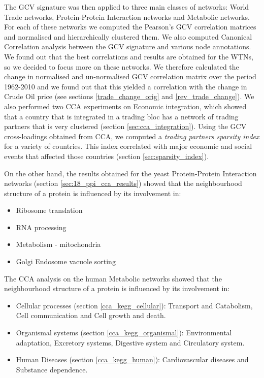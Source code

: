 The GCV signature was then applied to three main classes of networks: World Trade networks, Protein-Protein Interaction networks and Metabolic networks. For each of these networks we computed the Pearson's GCV correlation matrices and normalised and hierarchically clustered them. We also computed Canonical Correlation analysis between the GCV signature and various node annotations. We found out that the best correlations and results are obtained for the WTNs, so we decided to focus more on these networks. We therefore calculated the change in normalised and un-normalised GCV correlation matrix over the period 1962-2010 and we found out that this yielded a correlation with the change in Crude Oil price (see sections \ref{trade_change_orig} and \ref{rev_trade_change}). We also performed two CCA experiments on Economic integration, which showed that a country that is integrated in a trading bloc has a network of trading partners that is very clustered (section \ref{sec:cca_integration}). Using the 
GCV cross-loadings obtained from CCA, we computed a \emph{trading partners sparsity index} for a variety of countries. This index correlated with major economic and social events that affected those countries (section \ref{sec:sparsity_index}).

On the other hand, the results obtained for the yeast Protein-Protein Interaction networks (section \ref{sec:18_ppi_cca_results}) showed that the neighbourhood structure of a protein is influenced by its involvement in:
\begin{itemize}
 \item Ribosome translation
 \item RNA processing
 \item Metabolism - mitochondria
 \item Golgi Endosome vacuole sorting
\end{itemize}
The CCA analysis on the human Metabolic networks showed that the neighbourhood structure of a protein is influenced by its involvement in:
\begin{itemize}
 \item Cellular processes (section \ref{cca_kegg_cellular}): Transport and Catabolism, Cell communication and Cell growth and death.
 \item Organismal systems (section \ref{cca_kegg_organismal}): Environmental adaptation, Excretory systems, Digestive system and Circulatory system.
 \item Human Diseases (section \ref{cca_kegg_human}): Cardiovascular diseases and Substance dependence.
\end{itemize}

